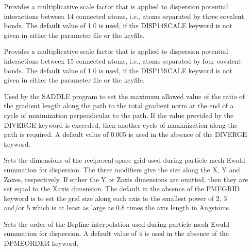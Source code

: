\documentclass[letterpaper,11pt,english]{sphinxmanual}
\begin{document}
  Provides a multiplicative scale factor that is applied to dispersion potential interactions between 1\sphinxhyphen{}4 connected atoms, i.e., atoms separated by three covalent bonds. The default value of 1.0 is used, if the DISP\sphinxhyphen{}14\sphinxhyphen{}SCALE keyword is not given in either the parameter file or the keyfile.

  Provides a multiplicative scale factor that is applied to dispersion potential interactions between 1\sphinxhyphen{}5 connected atoms, i.e., atoms separated by four covalent bonds. The default value of 1.0 is used, if the DISP\sphinxhyphen{}15\sphinxhyphen{}SCALE keyword is not given in either the parameter file or the keyfile.







  Used by the SADDLE program to set the maximum allowed value of the ratio of the gradient length along the path to the total gradient norm at the end of a cycle of minimization perpendicular to the path. If the value provided by the DIVERGE keyword is exceeded, then another cycle of maximization along the path is required. A default value of 0.005 is used in the absence of the DIVERGE keyword.

  Sets the dimensions of the reciprocal space grid used during particle mesh Ewald summation for dispersion. The three modifiers give the size along the X\sphinxhyphen{}, Y\sphinxhyphen{} and Z\sphinxhyphen{}axes, respectively. If either the Y\sphinxhyphen{} or Z\sphinxhyphen{}axis dimensions are omitted, then they are set equal to the X\sphinxhyphen{}axis dimension. The default in the absence of the PME\sphinxhyphen{}GRID keyword is to set the grid size along each axis to the smallest power of 2, 3 and/or 5 which is at least as large as 0.8 times the axis length in Angstoms.

  Sets the order of the B\sphinxhyphen{}spline interpolation used during particle mesh Ewald summation for dispersion. A default value of 4 is used in the absence of the DPME\sphinxhyphen{}ORDER keyword.
\end{document}
